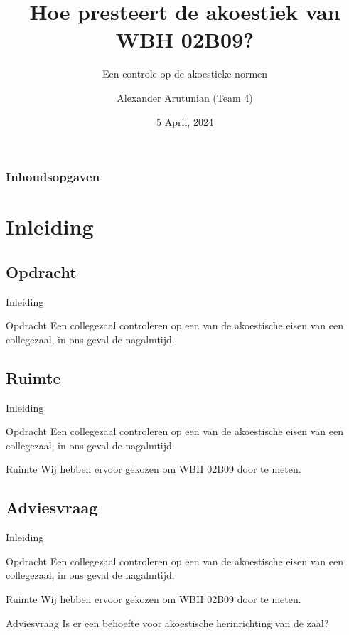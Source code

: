 \documentclass{beamer}
\title[Advies WBH 02B09]{Hoe presteert de akoestiek van WBH 02B09?}
\subtitle{Een controle op de akoestieke normen}
\author{Alexander Arutunian (Team 4)}
\institute[HvA]{Hogeschool van Amsterdam}
\date{5 April, 2024}
\begin{document}
\begin{frame}
\titlepage
\end{frame}


\begin{frame}
\frametitle{Inhoudsopgaven}
\tableofcontents[pausesections]
\end{frame}


\section{Inleiding}

\subsection{Opdracht}

\begin{frame}{Inleiding}
\begin{block}{Opdracht}
Een collegezaal controleren op een van de akoestische eisen van een collegezaal, in ons geval de nagalmtijd.
\end{block}
\end{frame}

\subsection{Ruimte}

\begin{frame}{Inleiding}
\begin{block}{Opdracht}
Een collegezaal controleren op een van de akoestische eisen van een collegezaal, in ons geval de nagalmtijd.
\end{block}
\begin{block}{Ruimte}
Wij hebben ervoor gekozen om WBH 02B09 door te meten.
\end{block}
\end{frame}

\subsection{Adviesvraag}

\begin{frame}{Inleiding}
\begin{block}{Opdracht}
Een collegezaal controleren op een van de akoestische eisen van een collegezaal, in ons geval de nagalmtijd.
\end{block}
\begin{block}{Ruimte}
Wij hebben ervoor gekozen om WBH 02B09 door te meten.
\end{block}
\begin{block}{Adviesvraag}
Is er een behoefte voor akoestische herinrichting van de zaal?
\end{block}
\end{frame}
\end{document}
